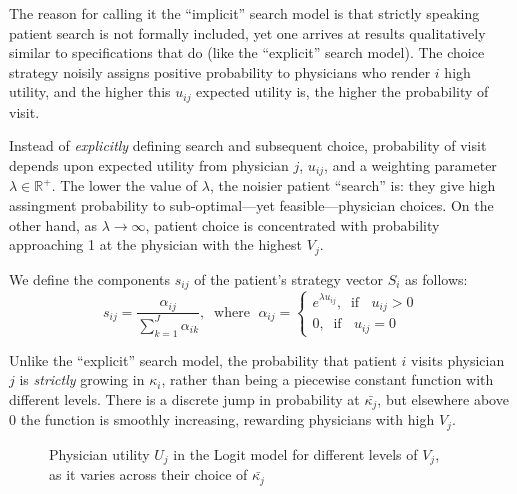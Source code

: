 \documentclass[../main.tex]{subfiles}
\begin{document}
The reason for calling it the ``implicit'' search model is that strictly speaking patient search is not formally included, yet one arrives at results qualitatively similar to specifications that do (like the ``explicit'' search model). The choice strategy noisily assigns positive probability to physicians who render $i$ high utility, and the higher this $u_{ij}$ expected utility is, the higher the probability of visit.

Instead of \textit{explicitly} defining search and subsequent choice, probability of visit depends upon expected utility from physician $j$, $u_{ij}$, and a weighting parameter $\lambda \in \mathbb{R}^+$. The lower the value of $\lambda$, the noisier patient ``search'' is: they give high assingment probability to sub-optimal—yet feasible—physician choices. On the other hand, as $\lambda \rightarrow \infty$, patient choice is concentrated with probability approaching 1 at the physician with the highest $V_j$.

We define the components $s_{ij}$ of the patient's strategy vector $S_i$ as follows:
\begin{equation}
s_{ij} = \frac{\alpha_{ij}}{\sum_{k = 1}^{J} \alpha_{ik}}, \; \; \text{where } \; \alpha_{ij} = \begin{cases}
e^{\lambda u_{ij}}, \; \; \text{if } \; \; u_{ij} > 0 \\
0 , \; \; \text{if } \; \; u_{ij} = 0
\end{cases}
\label{eq:Logit_s}
\end{equation}

Unlike the ``explicit'' search model, the probability that patient $i$ visits physician $j$ is \textit{strictly} growing in $\kappa_i$, rather than being a piecewise constant function with different levels. There is a discrete jump in probability at $\bar{\kappa_j}$, but elsewhere above $0$ the function is smoothly increasing, rewarding physicians with high $V_j$.

\vspace{0.7em}

\begin{figure}[H]
\centering
\begin{tikzpicture}[scale=0.6]

\end{tikzpicture}
\caption{Physician utility $U_j$ in the Logit model for different levels of $V_j$,\\ as it varies across their choice of $\bar{\kappa_j}$}
\label{fig:LogitUj}
\end{figure}
\end{document}
